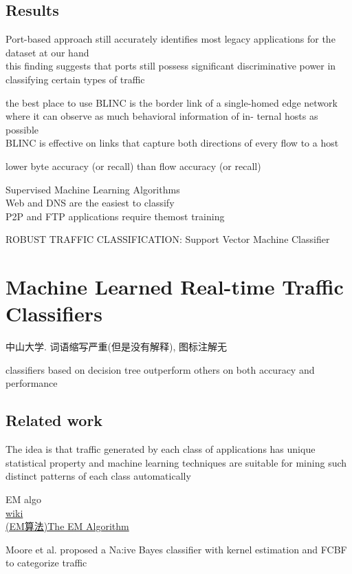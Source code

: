 \documentclass{article}
\begin{document}
\subsection{Results}
Port-based approach still accurately identifies most legacy applications for the dataset at our hand \\
this finding suggests that ports still possess significant discriminative power in classifying certain types of traffic

 the best place to use BLINC is the border link of a single-homed edge network where it can observe as much behavioral information of in- ternal hosts as possible\\
 BLINC is effective on links that capture both directions of every flow to a host

lower byte accuracy (or recall) than flow accuracy (or recall)

Supervised Machine Learning Algorithms\\
Web and DNS are the easiest to classify\\
P2P and FTP applications require themost training

ROBUST TRAFFIC CLASSIFICATION: Support Vector Machine Classifier

\section{Machine Learned Real-time Traffic Classifiers}\label{machine-learned-real-time-traffic-classifiers}
中山大学. 词语缩写严重(但是没有解释), 图标注解无

classifiers based on decision tree outperform others on both accuracy and performance

\subsection{Related work}\label{related-work-1}
The idea is that traffic generated by each class of applications has
unique statistical property and machine learning techniques are suitable
for mining such distinct patterns of each class automatically

EM algo\\
\href{http://en.wikipedia.org/wiki/Expectation\%E2\%80\%93maximization_algorithm}{wiki}\\
\href{http://www.cnblogs.com/jerrylead/archive/2011/04/06/2006936.html}{(EM算法)The EM Algorithm}

Moore et al. proposed a Na:ive Bayes classifier with kernel estimation and FCBF to categorize traffic
\end{document}

